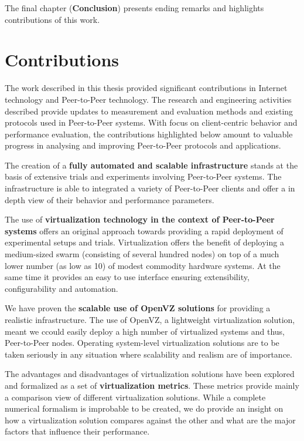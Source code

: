 The final chapter (\textbf{Conclusion}) presents ending remarks and
highlights contributions of this work.

\section{Contributions}
\label{sec:conclusion:contributions}

The work described in this thesis provided significant contributions in
Internet technology and Peer-to-Peer technology. The research and engineering
activities described provide updates to measurement and evaluation methods and
existing protocols used in Peer-to-Peer systems. With focus on client-centric
behavior and performance evaluation, the contributions highlighted below
amount to valuable progress in analysing and improving Peer-to-Peer protocols
and applications.

The creation of a \textbf{fully automated and scalable infrastructure} stands
at the basis of extensive trials and experiments involving Peer-to-Peer
systems. The infrastructure is able to integrated a variety of Peer-to-Peer
clients and offer a in depth view of their behavior and performance
parameters.

The use of \textbf{virtualization technology in the context of Peer-to-Peer
systems} offers an original approach towards providing a rapid deployment of
experimental setups and trials. Virtualization offers the benefit of deploying
a medium-sized swarm (consisting of several hundred nodes) on top of a much
lower number (as low as 10) of modest commodity hardware systems. At the same
time it provides an easy to use interface ensuring extensibility,
configurability and automation.

We have proven the \textbf{scalable use of OpenVZ solutions} for providing a
realistic infrastructure. The use of OpenVZ, a lightweight virtualization
solution, meant we ccould easily deploy a high number of virtualized systems
and thus, Peer-to-Peer nodes. Operating system-level virtualization solutions
are to be taken seriously in any situation where scalability and realism are
of importance.

The advantages and disadvantages of virtualization solutions have been
explored and formalized as a set of \textbf{virtualization metrics}. These
metrics provide mainly a comparison view of different virtualization
solutions. While a complete numerical formalism is improbable to be created,
we do provide an insight on how a virtualization solution compares against the
other and what are the major factors that influence their performance.

